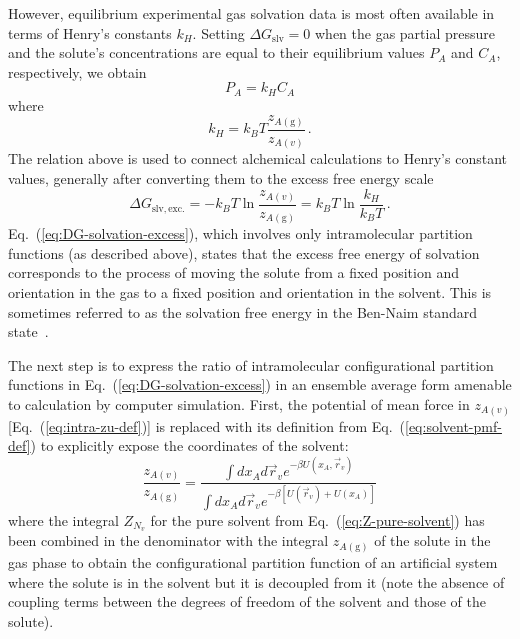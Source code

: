 \documentclass[9pt,bestpractices]{livecoms}
\begin{document}
However, equilibrium experimental gas solvation data is most often available in terms of Henry's constants $k_H$. Setting $\Delta G_{\mathrm{slv}} = 0$ when the gas partial pressure and the solute's concentrations are equal to their equilibrium values $P_A$ and $C_A$, respectively, we obtain
\begin{equation}
  P_A = k_H C_A
  \label{eq:Henrys-law}
\end{equation}
where
\begin{equation}
  k_H = k_B T \frac{z_{A(\mathrm{g})}}{z_{A(v)}} \, .
  \label{eq:Henrys-constant}
\end{equation}
The relation above is used to connect alchemical calculations to Henry's constant values, generally after converting them to the excess free energy scale~\cite{cabani1981group,nicholls2008predicting,mobley2014freesolv}
\begin{equation}
\Delta G_{\mathrm{slv, exc.}} = - k_B T \ln \frac{z_{A(v)}}{z_{A(\mathrm{g})}} = k_B T \ln \frac{k_H}{k_B T} \, .
\label{eq:DG-solvation-excess}
\end{equation}
Eq.~(\ref{eq:DG-solvation-excess}), which involves only intramolecular partition functions (as described above),  states that the excess free energy of solvation corresponds to the process of moving the solute from a fixed position and orientation in the gas to a fixed position and orientation in the solvent. This is sometimes referred to as the solvation free energy in the Ben-Naim standard state~\cite{bennaim1984solvation}.

The next step is to express the ratio of intramolecular configurational partition functions in Eq.~(\ref{eq:DG-solvation-excess}) in an ensemble average form amenable to calculation by computer simulation. First, the potential of mean force in $z_{A(v)}$ [Eq.~(\ref{eq:intra-zu-def})] is replaced with its definition from Eq.~(\ref{eq:solvent-pmf-def}) to explicitly expose the coordinates of the solvent:
\begin{equation}
  \frac{z_{A(v)}}{z_{A(\mathrm{g})}} =
  \frac{
    \int dx_A d\vec{r}_v e^{-\beta U(x_A, \vec{r}_v)}
  }{
    \int dx_A d\vec{r}_v e^{-\beta [U(\vec{r}_v) + U(x_A)] }
  }
\end{equation}
where the integral $Z_{N_v}$ for the pure solvent from Eq.~(\ref{eq:Z-pure-solvent}) has been combined in the denominator with the integral $z_{A(\mathrm{g})}$ of the solute in the gas phase to obtain the configurational partition function of an artificial system where the solute is in the solvent but it is decoupled from it (note the absence of coupling terms between the degrees of freedom of the solvent and those of the solute).
\end{document}
